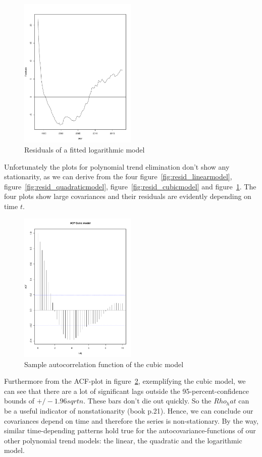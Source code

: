 \documentclass[11pt,a4paper]{article}
\begin{document}
\begin{figure}[!htb]
\centering
\includegraphics[angle=0,
width=0.5\textwidth]{resid_logmodel}
\caption{Residuals of a fitted logarithmic model
\label{fig:resid_logmodel}}
\end{figure}
Unfortunately the plots for polynomial trend elimination don't show any stationarity, as we can derive from the four figure~\ref{fig:resid_linearmodel}, figure~\ref{fig:resid_quadraticmodel}, figure~\ref{fig:resid_cubicmodel} and figure~\ref{fig:resid_logmodel}. The four plots show large covariances and their residuals are evidently depending on time $t$.
\\
\begin{figure}[!htb]
\centering
\includegraphics[angle=0,
width=0.5\textwidth]{acf_cubicmodel}
\caption{Sample autocorrelation function of the cubic model
\label{fig:acf_cubicmodel}}
\end{figure}
Furthermore from the ACF-plot in figure~\ref{fig:acf_cubicmodel}, exemplifying the cubic model, we can see that there are a lot of significant lags outside the 95-percent-confidence bounds of $+/-1.96sqrt{n}$.  These bars don't die out quickly. So the $Rho_hat$ can be a useful indicator of nonstationarity (book p.21). Hence, we can conclude our covariances depend on time and therefore the series is non-stationary. By the way, similar time-depending patterns hold true for the autocovariance-functions of our other polynomial trend models: the linear, the quadratic and the logarithmic model. 
\end{document}
